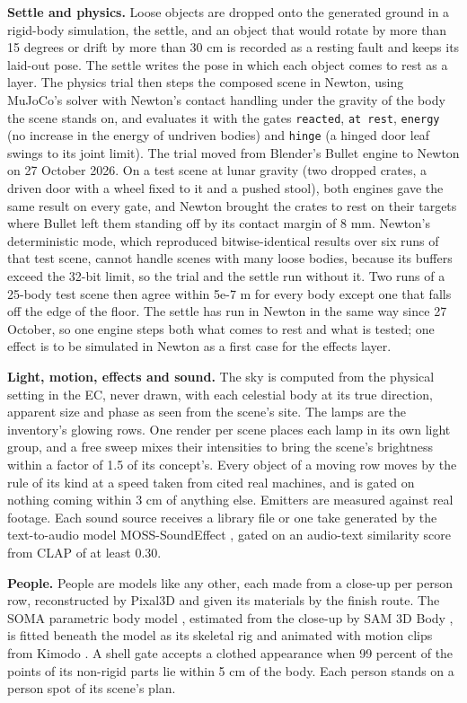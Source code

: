 \textbf{Settle and physics.} Loose objects are dropped onto the generated ground in a rigid-body simulation, the settle, and an object that would rotate by more than 15 degrees or drift by more than 30 cm is recorded as a resting fault and keeps its laid-out pose. The settle writes the pose in which each object comes to rest as a layer. The physics trial then steps the composed scene in Newton, using MuJoCo's solver with Newton's contact handling under the gravity of the body the scene stands on, and evaluates it with the gates \texttt{reacted}, \texttt{at\ rest}, \texttt{energy} (no increase in the energy of undriven bodies) and \texttt{hinge} (a hinged door leaf swings to its joint limit). The trial moved from Blender's Bullet engine \citep{bullet} to Newton on 27 October 2026. On a test scene at lunar gravity (two dropped crates, a driven door with a wheel fixed to it and a pushed stool), both engines gave the same result on every gate, and Newton brought the crates to rest on their targets where Bullet left them standing off by its contact margin of 8 mm. Newton's deterministic mode, which reproduced bitwise-identical results over six runs of that test scene, cannot handle scenes with many loose bodies, because its buffers exceed the 32-bit limit, so the trial and the settle run without it. Two runs of a 25-body test scene then agree within 5e-7 m for every body except one that falls off the edge of the floor. The settle has run in Newton in the same way since 27 October, so one engine steps both what comes to rest and what is tested; one effect is to be simulated in Newton as a first case for the effects layer.

\textbf{Light, motion, effects and sound.} The sky is computed from the physical setting in the EC, never drawn, with each celestial body at its true direction, apparent size and phase as seen from the scene's site. The lamps are the inventory's glowing rows. One render per scene places each lamp in its own light group, and a free sweep mixes their intensities to bring the scene's brightness within a factor of 1.5 of its concept's. Every object of a moving row moves by the rule of its kind at a speed taken from cited real machines, and is gated on nothing coming within 3 cm of anything else. Emitters are measured against real footage. Each sound source receives a library file or one take generated by the text-to-audio model MOSS-SoundEffect \citep{moss2026}, gated on an audio-text similarity score from CLAP \citep{wu2022clap} of at least 0.30.

\textbf{People.} People are models like any other, each made from a close-up per person row, reconstructed by Pixal3D and given its materials by the finish route. The SOMA parametric body model \citep{saito2026soma}, estimated from the close-up by SAM 3D Body \citep{yang2026sam3dbody}, is fitted beneath the model as its skeletal rig and animated with motion clips from Kimodo \citep{rempe2026kimodo}. A shell gate accepts a clothed appearance when 99 percent of the points of its non-rigid parts lie within 5 cm of the body. Each person stands on a person spot of its scene's plan.

